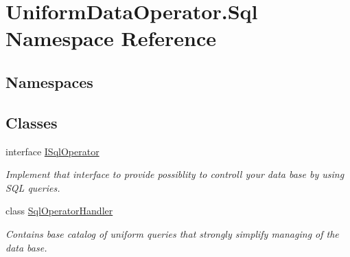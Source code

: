 \hypertarget{namespace_uniform_data_operator_1_1_sql}{}\section{Uniform\+Data\+Operator.\+Sql Namespace Reference}
\label{namespace_uniform_data_operator_1_1_sql}
\subsection*{Namespaces}
\begin{DoxyCompactItemize}
\end{DoxyCompactItemize}
\subsection*{Classes}
\begin{DoxyCompactItemize}
\item 
interface \mbox{\hyperlink{interface_uniform_data_operator_1_1_sql_1_1_i_sql_operator}{I\+Sql\+Operator}}
\begin{DoxyCompactList}\small\item\em Implement that interface to provide possiblity to controll your data base by using S\+QL queries. \end{DoxyCompactList}\item 
class \mbox{\hyperlink{class_uniform_data_operator_1_1_sql_1_1_sql_operator_handler}{Sql\+Operator\+Handler}}
\begin{DoxyCompactList}\small\item\em Contains base catalog of uniform queries that strongly simplify managing of the data base. \end{DoxyCompactList}\end{DoxyCompactItemize}
